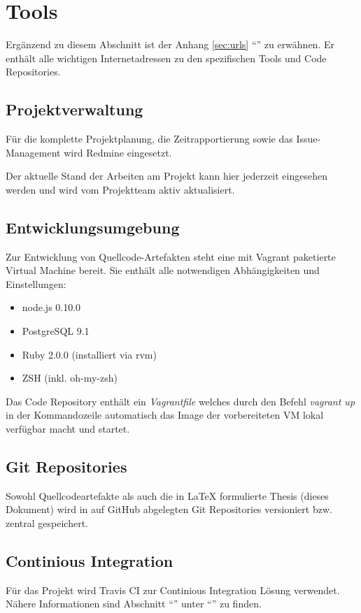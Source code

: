 \section{Tools}
\label{sec:tools}

Ergänzend zu diesem Abschnitt ist der Anhang \ref{sec:urls} ``'' zu erwähnen. Er enthält alle wichtigen Internetadressen zu den spezifischen Tools und Code Repositories.

\subsection{Projektverwaltung}
Für die komplette Projektplanung, die Zeitrapportierung sowie das Issue-Management wird Redmine eingesetzt.

Der aktuelle Stand der Arbeiten am Projekt kann hier jederzeit eingesehen werden und wird vom Projektteam aktiv aktualisiert.


\subsection{Entwicklungsumgebung}
Zur Entwicklung von Quellcode-Artefakten steht eine mit Vagrant \cite{Vagrant} paketierte Virtual Machine bereit. Sie enthält alle notwendigen Abhängigkeiten und Einstellungen:


\begin{itemize}
	\item node.js 0.10.0
	\item PostgreSQL 9.1
	\item Ruby 2.0.0 (installiert via rvm)
	\item ZSH (inkl. oh-my-zsh)
\end{itemize}

Das Code Repository enthält ein \emph{Vagrantfile} welches durch den Befehl \emph{vagrant up} in der Kommandozeile automatisch das Image der vorbereiteten VM lokal verfügbar macht und startet.

\subsection{Git Repositories}
Sowohl Quellcodeartefakte als auch die in LaTeX formulierte Thesis (dieses Dokument) wird in auf GitHub abgelegten Git Repositories versioniert bzw. zentral gespeichert.

\subsection{Continious Integration}
Für das Projekt wird Travis CI zur Continious Integration Lösung verwendet. Nähere Informationen sind Abschnitt ``'' unter ``'' zu finden.